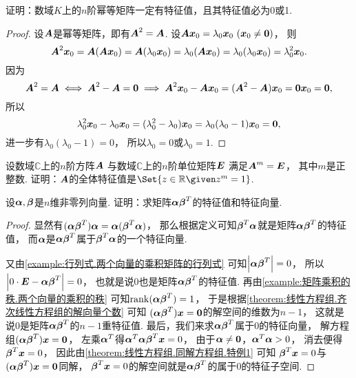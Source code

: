 \begin{example}\label{example:幂等矩阵.幂等矩阵的特征值的性质}
证明：数域\(K\)上的\(n\)阶幂等矩阵一定有特征值，且其特征值必为0或1.
\begin{proof}
设\(\boldsymbol{A}\)是幂等矩阵，即有\(\boldsymbol{A}^2=\boldsymbol{A}\).
设\(\vb{A}\vb{x}_0=\lambda_0\vb{x}_0\ (\vb{x}_0\neq\vb0)\)，
则\[
	\boldsymbol{A}^2\boldsymbol{x}_0
	=\boldsymbol{A}(\boldsymbol{A}\boldsymbol{x}_0)
	=\boldsymbol{A}(\lambda_0\boldsymbol{x}_0)
	=\lambda_0(\boldsymbol{A}\boldsymbol{x}_0)
	=\lambda_0(\lambda_0\boldsymbol{x}_0)
	=\lambda_0^2\boldsymbol{x}_0.
\]
因为\[
	\boldsymbol{A}^2=\boldsymbol{A}
	\iff
	\boldsymbol{A}^2-\boldsymbol{A}=\boldsymbol0
	\implies
	\boldsymbol{A}^2\boldsymbol{x}_0-\boldsymbol{A}\boldsymbol{x}_0
	=(\boldsymbol{A}^2-\boldsymbol{A})\boldsymbol{x}_0
	=\boldsymbol0\boldsymbol{x}_0
	=\boldsymbol0,
\]
所以\[
	\lambda_0^2\boldsymbol{x}_0-\lambda_0\boldsymbol{x}_0
	=(\lambda_0^2-\lambda_0)\boldsymbol{x}_0
	=\lambda_0(\lambda_0-1)\boldsymbol{x}_0
	=\boldsymbol0,
\]
进一步有\(\lambda_0(\lambda_0-1)=0\)，
所以\(\lambda_0=0\)或\(\lambda_0=1\).
\end{proof}
\end{example}

\begin{example}
设数域\(\mathbb{C}\)上的\(n\)阶方阵\(\boldsymbol{A}\)
与数域\(\mathbb{C}\)上的\(n\)阶单位矩阵\(\boldsymbol{E}\)
满足\(\boldsymbol{A}^m=\boldsymbol{E}\)，
其中\(m\)是正整数.
证明：\(\boldsymbol{A}\)的全体特征值是\(\Set{ z\in\mathbb{R} \given z^m = 1 }\).
\end{example}

\begin{example}\label{example:矩阵乘积的秩.两个向量的乘积的特征值和特征向量}
设\(\boldsymbol\alpha,\boldsymbol\beta\)是\(n\)维非零列向量.
证明：求矩阵\(\boldsymbol\alpha\boldsymbol\beta^T\)的特征值和特征向量.
\begin{proof}
显然有\((\boldsymbol\alpha\boldsymbol\beta^T)\boldsymbol\alpha = \boldsymbol\alpha(\boldsymbol\beta^T\boldsymbol\alpha)\)，
那么根据定义可知\(\boldsymbol\beta^T\boldsymbol\alpha\)就是矩阵\(\boldsymbol\alpha\boldsymbol\beta^T\)的特征值，
而\(\boldsymbol\alpha\)是\(\boldsymbol\alpha\boldsymbol\beta^T\)属于\(\boldsymbol\beta^T\boldsymbol\alpha\)的一个特征向量.

又由\cref{example:行列式.两个向量的乘积矩阵的行列式} 可知\(\abs{\boldsymbol\alpha\boldsymbol\beta^T} = 0\)，
所以\(\abs{0\cdot\boldsymbol{E}-\boldsymbol\alpha\boldsymbol\beta^T}=0\)，
也就是说\(0\)也是矩阵\(\boldsymbol\alpha\boldsymbol\beta^T\)的特征值.
再由\cref{example:矩阵乘积的秩.两个向量的乘积的秩} 可知\(\rank(\boldsymbol\alpha\boldsymbol\beta^T) = 1\)，
于是根据\cref{theorem:线性方程组.齐次线性方程组的解向量个数} 可知
\((\boldsymbol\alpha\boldsymbol\beta^T)\boldsymbol{x}=\boldsymbol0\)的解空间的维数为\(n-1\)，
这就是说\(0\)是矩阵\(\boldsymbol\alpha\boldsymbol\beta^T\)的\(n-1\)重特征值.
最后，我们来求\(\boldsymbol\alpha\boldsymbol\beta^T\)属于\(0\)的特征向量，
解方程组\((\boldsymbol\alpha\boldsymbol\beta^T)\boldsymbol{x}=\boldsymbol0\)，
左乘\(\boldsymbol\alpha^T\)得\(\boldsymbol\alpha^T\boldsymbol\alpha\boldsymbol\beta^T\boldsymbol{x}=0\)，
由于\(\boldsymbol\alpha\neq\boldsymbol0\)，\(\boldsymbol\alpha^T\boldsymbol\alpha>0\)，
消去便得\(\boldsymbol\beta^T\boldsymbol{x}=0\)，
因此由\cref{theorem:线性方程组.同解方程组.特例1} 可知
\(\boldsymbol\beta^T\boldsymbol{x}=0\)与\((\boldsymbol\alpha\boldsymbol\beta^T)\boldsymbol{x}=\boldsymbol0\)同解，
\(\boldsymbol\beta^T\boldsymbol{x}=0\)的解空间就是\(\boldsymbol\alpha\boldsymbol\beta^T\)的属于\(0\)的特征子空间.
\end{proof}
\end{example}

